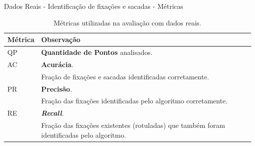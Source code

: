 \documentclass[10pt]{beamer}
\begin{document}
\begin{frame}{Dados Reais - Identificação de fixações e sacadas -  Métricas}
    \begin{table}[h]
        \centering
        \caption{Métricas utilizadas na avaliação com dados reais.}
        \label{tbl:metricas_rbfchain}
        \begin{tabularx}{\textwidth}{lX}
        \toprule
        Métrica  & Observação \\
        \midrule
        QP       &  \textbf{Quantidade de Pontos} analisados. \\
        AC       &  \textbf{Acurácia}.  \\
                 & Fração de fixações e sacadas identificadas corretamente. \\

        PR       &  \textbf{Precisão}.  \\
                 & Fração das fixações identificadas pelo algoritmo corretamente.  \\

        RE       &  \textbf{\textit{Recall}}.  \\
                 & Fração das fixações existentes (rotuladas) que também foram identificadas pelo algoritmo.  \\

        \bottomrule
        \end{tabularx}
        \end{table}
\end{frame}
\end{document}
